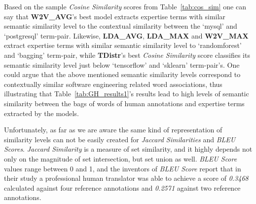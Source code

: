             \begin{table}
                  \centering
                  \caption{Example of Cosine Similarity Scores between Term-Pairs.} \label{tab:cos_sim}
                  \vspace{6pt} %
            \end{table}
            
            Based on the sample \emph{Cosine Similarity} scores from Table~\ref{tab:cos_sim} one can say that \textbf{W2V\_AVG}'s best model extracts expertise terms with similar semantic similarity level to the contextual similarity between the `mysql' and `postgresql' term-pair. Likewise, \textbf{LDA\_AVG}, \textbf{LDA\_MAX} and \textbf{W2V\_MAX} extract expertise terms with similar semantic similarity level to `randomforest' and `bagging' term-pair, while \textbf{TDistr}'s best \emph{Cosine Similarity} score classifies its semantic similarity level just below `tensorflow' and `sklearn' term-pair's. One could argue that the above mentioned semantic similarity levels correspond to contextually similar software engineering related word associations, thus illustrating that Table~\ref{tab:GH_results1}'s results lead to high levels of semantic similarity between the bags of words of human annotations and expertise terms extracted by the models.
            
            Unfortunately, as far as we are aware the same kind of representation of similarity levels can not be easily created for \emph{Jaccard Similarities} and \emph{BLEU Scores}. \emph{Jaccard Similarity} is a measure of set similarity, and it highly depends not only on the magnitude of set intersection, but set union as well. \emph{BLEU Score} values range between 0 and 1, and the inventors of \emph{BLEU Score} report that in their study a professional human translator was able to achieve a score of \emph{0.3468} calculated against four reference annotations and \emph{0.2571} against two reference annotations\cite{papineni2002bleu}.
        
